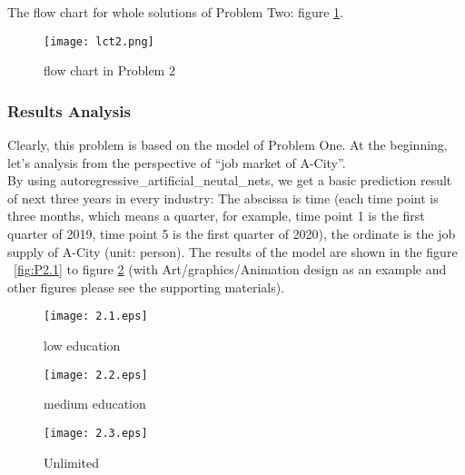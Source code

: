 \documentclass{mcmthesis}
\begin{document}
The flow chart for whole solutions of Problem Two: figure \ref{fig:Plct2}.
\begin{figure}[h]
	\centering
	\texttt{[image: lct2.png]}
	\caption{flow chart in Problem 2} \label{fig:Plct2}
\end{figure}

\subsubsection{Results Analysis}
Clearly, this problem is based on the model of Problem One. At the beginning, let's analysis from the perspective of ``job market of A-City''.\\
 By using autoregressive\_artificial\_neutal\_nets, we get a basic prediction result of next three years in every industry: The abscissa is time (each time point is three months, which means a quarter, for example, time point 1 is the first quarter of 2019, time point 5 is the first quarter of 2020), the ordinate is the job supply of A-City (unit: person). The results of the model are shown in the figure ~\ref{fig:P2.1} to figure \ref{fig:P2.3} (with Art/graphics/Animation design as an example and other figures please see the supporting materials).

%

%
%
%

\begin{figure}[h]
	\begin{minipage}[h]{0.31\linewidth}
		\centering
		\texttt{[image: 2.1.eps]}
		\caption{low education}
		\label{fig:P2.1}
	\end{minipage}
	\begin{minipage}[h]{0.31\linewidth}
		\centering
		\texttt{[image: 2.2.eps]}
		\caption{medium education}
		\label{fig:P2.2}
	\end{minipage}
	\begin{minipage}[h]{0.31\linewidth}
		\centering
		\texttt{[image: 2.3.eps]}
		\caption{Unlimited}
		\label{fig:P2.3}
	\end{minipage}
\end{figure}
\end{document}
